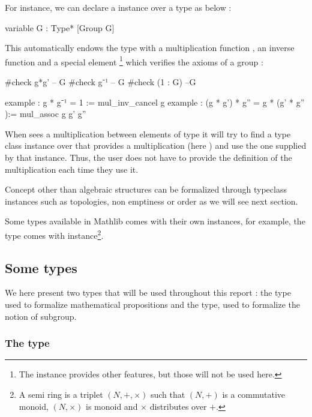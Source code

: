 For instance, we can declare a  instance over a type  as below :

\begin{leancode}
variable {G : Type*} [Group G]
\end{leancode}

This automatically endows the type  with a multiplication function , an inverse function  and a special element  \footnote{The  instance provides other features, but those will not be used here.} which verifies the axioms of a group :

\begin{leancode}
#check g*g' -- G
#check g⁻¹ -- G
#check (1 : G) --G

example : g * g⁻¹ = 1 := mul_inv_cancel g
example : (g * g') * g'' = g * (g' * g'' ):= mul_assoc g g' g''
\end{leancode}

When \Lean sees a multiplication between elements of type  it will try to find a type class instance over  that provides a multiplication (here ) and use the one supplied by that instance. Thus, the user does not have to provide the definition of the multiplication each time they use it.

Concept other than algebraic structures can be formalized through typeclass instances such as topologies, non emptiness or order as we will see next section.

Some types available in Mathlib comes with their own instances, for example, the type  comes with  instance\footnote{A semi ring is a triplet $\left( N, +, \times  \right)$ such that $\left( N,+ \right)$ is a commutative monoid, $\left( N, \times  \right)$ is monoid and $\times $ distributes over $+$.}.


\subsection{Some types}%
\label{sub:somtypes}
We here present two types that will be used throughout this report : the  type used to formalize mathematical propositions and the  type, used to formalize the notion of subgroup.

\subsubsection{The  type}

